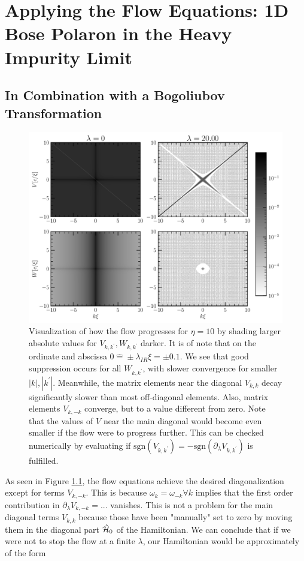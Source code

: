 \chapter{Applying the Flow Equations: 1D Bose Polaron in the Heavy Impurity Limit}\label{Results}
\section{In Combination with a Bogoliubov Transformation}
\begin{figure}[H]
    \centering
    \includegraphics[width=\textwidth]{figures/plots/PDF/FlowIllustration.pdf}
    \caption[Flow Visualization for $\eta=10$]{Visualization of how the flow progresses for $\eta=10$ by shading larger absolute values for $V_{k,k^\prime},W_{k,k^\prime}$ darker. It is of note that on the ordinate and abscissa $0\widehat = \pm \lambda_{IR}\xi=\pm 0.1$. We see that good suppression occurs for all $W_{k,k^\prime}$, with slower convergence for smaller $|k|,|k^\prime|$.  Meanwhile, the matrix elements near the diagonal $V_{k,k}$ decay significantly slower than most off-diagonal elements. Also, matrix elements $V_{k,-k}$ converge, but to a value different from zero. Note that the values of $V$ near the main diagonal would  become even smaller if the flow were to progress further. This can be checked numerically by evaluating if $\mathrm{sgn}\left( V_{k,k^\prime}\right)=-\mathrm{sgn}\left( \partial_\lambda V_{k,k^\prime}\right)$ is fulfilled.}
    \label{FlowIllustration}
\end{figure}
As seen in Figure \ref{FlowIllustration}, the flow equations achieve the desired diagonalization except for terms $V_{k,-k}$. This is because $\omega_k=\omega_{-k}\forall k$ implies that the first order contribution in $\partial_\lambda V_{k,-k} =...$ vanishes. This is not a problem for the main diagonal terms $V_{k,k}$ because those have been "manually" set to zero by moving them in the diagonal part $\hat{\mathcal{H}}_0$ of the Hamiltonian. We can conclude that if we were not to stop the flow at a finite $\lambda$, our Hamiltonian would be approximately of the form 
